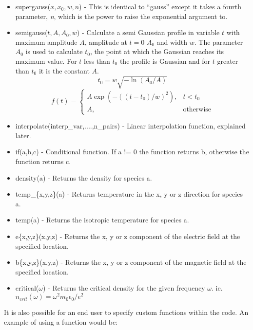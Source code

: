 \begin{itemize}
\item supergauss($x,x_0,w,n$) - This is identical to ``gauss'' except it
    takes a fourth parameter, {\it n}, which is the power to raise the
    exponential argument to.
\item semigauss($t,A,A_0,w$) - Calculate a semi Gaussian profile in variable
    $t$ with maximum amplitude $A$, amplitude at $t=0$ $A_0$ and width $w$.
    The parameter $A_0$ is used to calculate $t_0$, the point at which the
    Gaussian reaches its maximum value. For $t$ less than $t_0$ the profile
    is Gaussian and for $t$ greater than $t_0$ it is the constant $A$.
\[
t_0 = w\sqrt{-\ln{(A_0/A)}}
\]\[
f(t) =
\begin{cases}
A \exp{(-((t-t_0)/w)^2)}, & t < t_0 \\
A, & \mbox{otherwise}
\end{cases}
\]
\item interpolate(interp\_var,....,n\_pairs) - Linear interpolation function,
  explained later.
\item if(a,b,c) - Conditional function. If a != 0 the function returns b,
  otherwise the function returns c.

\item density(a) - Returns the density for species a.
\item temp\_\{x,y,z\}(a) - Returns temperature in the x, y or z direction for
    species a.
\item temp(a) - Returns the isotropic temperature for species a.
\item e\{x,y,z\}(x,y,z) - Returns the x, y or z component of the electric
    field at the specified location.
\item b\{x,y,z\}(x,y,z) - Returns the x, y or z component of the magnetic
    field at the specified location.
\item critical($\omega$) - Returns the critical density for the given
    frequency $\omega$. ie. $n_{crit}(\omega) = \omega^2 m_0 \epsilon_0 / e^2$
\end{itemize}

It is also possible for an end user to specify custom functions within the
code. An example of using a function would be:\\
\indent{}\\

